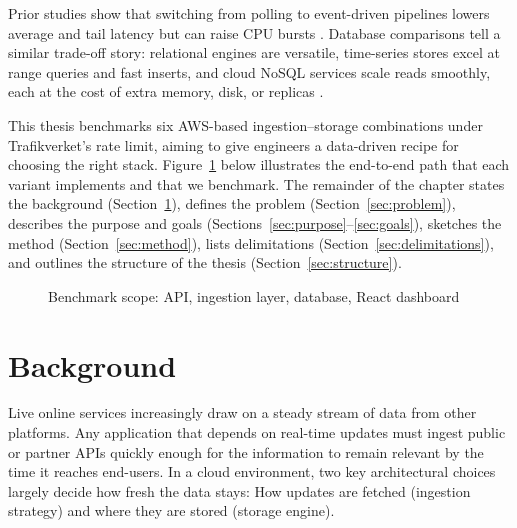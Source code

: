 \documentclass[nomenclature, english, biblatex]{kththesis}
\numberwithin{listing}{chapter}
\begin{document}
\noindent
Prior studies show that switching from polling to event-driven pipelines lowers average and tail latency but can raise CPU bursts \cite{Trindade2021EDAImpact}. 
Database comparisons tell a similar trade-off story: relational engines are versatile, time-series stores excel at range queries and fast inserts, and cloud NoSQL services scale reads smoothly, each at the cost of extra memory, disk, or replicas \cite{Heldt2021SciTS,Grzesik2020EdgeIoTBenchmark,Vergara2021PerformanceTSDB}.

\noindent
This thesis benchmarks six AWS-based ingestion–storage combinations under Trafikverket's rate limit, aiming to give engineers a data-driven recipe for choosing the right stack. Figure~\ref{fig:pipeline} below illustrates the end-to-end path that each variant implements and that we benchmark.
The remainder of the chapter states the background (Section~\ref{sec:background}), defines the problem (Section~\ref{sec:problem}), describes the purpose and goals (Sections~\ref{sec:purpose}–\ref{sec:goals}), sketches the method (Section~\ref{sec:method}), lists delimitations (Section~\ref{sec:delimitations}), and outlines the structure of the thesis (Section~\ref{sec:structure}).

\begin{figure}[htbp]
  \centering
  \caption{Benchmark scope: API, ingestion layer, database, React dashboard}
  \label{fig:pipeline}
\end{figure}




\section{Background}
\label{sec:background}
Live online services increasingly draw on a steady stream of data from other platforms. Any application that depends on real-time updates must ingest public or partner \glspl{API} quickly enough for the information to remain relevant by the time it reaches end-users. In a cloud environment, two key architectural choices largely decide how fresh the data stays: How updates are fetched (ingestion strategy) and where they are stored (storage engine).
\end{document}
